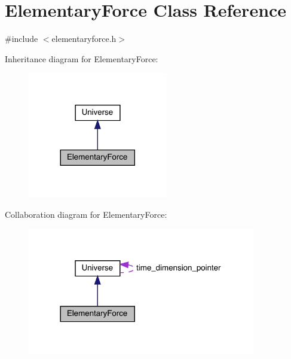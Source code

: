 \hypertarget{class_elementary_force}{}\section{Elementary\+Force Class Reference}
\label{class_elementary_force}


{\ttfamily \#include $<$elementaryforce.\+h$>$}



Inheritance diagram for Elementary\+Force\+:\nopagebreak
\begin{figure}[H]
\begin{center}
\leavevmode
\includegraphics[width=173pt]{class_elementary_force__inherit__graph}
\end{center}
\end{figure}


Collaboration diagram for Elementary\+Force\+:
\nopagebreak
\begin{figure}[H]
\begin{center}
\leavevmode
\includegraphics[width=282pt]{class_elementary_force__coll__graph}
\end{center}
\end{figure}
